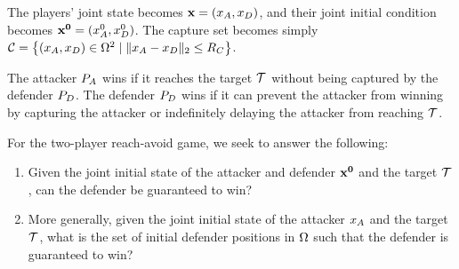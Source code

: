 The players' joint state becomes $\mathbf{x}=(x_A,x_D)$, and their joint initial condition becomes $\mathbf{x^0}=(x_A^0,x_D^0)$. The capture set becomes simply $\mathcal{C} = \left\{(x_A,x_D)\in\Omega^2 \mid \|x_A-x_D\|_2\leq R_C\right\}$. 

The attacker $P_A$ wins if it reaches the target $\mathcal{T}$ without being captured by the defender $P_D$. The defender $P_D$ wins if it can prevent the attacker from winning by capturing the attacker or indefinitely delaying the attacker from reaching $\mathcal{T}$. 

For the two-player reach-avoid game, we seek to answer the following:
\begin{enumerate}
\item Given the joint initial state of the attacker and defender $\mathbf{x^0}$ and the target $\mathcal{T}$, can the defender be guaranteed to win? \label{p:tp1}
\item More generally, given the joint initial state of the attacker $x_A$ and the target $\mathcal{T}$, what is the set of initial defender positions in $\Omega$ such that the defender is guaranteed to win? \label{p:tp2}
\end{enumerate}
